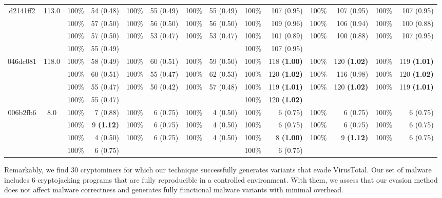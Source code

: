 \begin{adjustbox}{width=1\linewidth}
{\begin{tabular}{c c | cr  cr  cr || cr  cr  cr}
        \hline
   d2141ff2  &  113.0    &  100\%  & 54 (0.48)   &  100\%  & 55 (0.49)   &  100\%  & 55 (0.49)    &  100\%  & 107 (0.95)   &  100\%  & 107 (0.95)   &  100\%  & 107 (0.95)  \\ &    &  100\%  & 57 (0.50)   &  100\%  & 56 (0.50)   &  100\%  & 56 (0.50)    &  100\%  & 109 (0.96)   &  100\%  & 106 (0.94)   &  100\%  & 100 (0.88)  \\ &    &  100\%  & 57 (0.50)   &  100\%  & 53 (0.47)   &  100\%  & 53 (0.47)    &  100\%  & 101 (0.89)   &  100\%  & 100 (0.88)   &  100\%  & 107 (0.95)  \\ &    &  100\%  & 55 (0.49)     &   &  &  &   &  100\%  & 107 (0.95)  \\
        \hline
   046dc081  &  118.0    &  100\%  & 58 (0.49)   &  100\%  & 60 (0.51)   &  100\%  & 59 (0.50)    &  100\%  & 118 \textbf{(1.00)}    &  100\%  & 120 \textbf{(1.02)}    &  100\%  & 119 \textbf{(1.01)}   \\ &    &  100\%  & 60 (0.51)   &  100\%  & 55 (0.47)   &  100\%  & 62 (0.53)    &  100\%  & 120 \textbf{(1.02)}    &  100\%  & 116 (0.98)   &  100\%  & 120 \textbf{(1.02)}   \\ &    &  100\%  & 55 (0.47)   &  100\%  & 50 (0.42)   &  100\%  & 57 (0.48)    &  100\%  & 119 \textbf{(1.01)}    &  100\%  & 120 \textbf{(1.02)}    &  100\%  & 119 \textbf{(1.01)}   \\ &    &  100\%  & 55 (0.47)     &   &  &  &   &  100\%  & 120 \textbf{(1.02)}   \\
        \hline
   006b2fb6  &  8.0    &  100\%  & 7 (0.88)   &  100\%  & 6 (0.75)   &  100\%  & 4 (0.50)    &  100\%  & 6 (0.75)   &  100\%  & 6 (0.75)   &  100\%  & 6 (0.75)  \\ &    &  100\%  & 9 \textbf{(1.12)}    &  100\%  & 6 (0.75)   &  100\%  & 4 (0.50)    &  100\%  & 6 (0.75)   &  100\%  & 6 (0.75)   &  100\%  & 6 (0.75)  \\ &    &  100\%  & 4 (0.50)   &  100\%  & 6 (0.75)   &  100\%  & 4 (0.50)    &  100\%  & 8 \textbf{(1.00)}    &  100\%  & 9 \textbf{(1.12)}    &  100\%  & 6 (0.75)  \\ &    &  100\%  & 6 (0.75)     &   &  &  &  &  100\%  & 6 (0.75)  \\
        \hline
    
        
    \end{tabular}
}
\end{adjustbox}




Remarkably, we find 30 cryptominers for which our technique successfully generates variants that evade VirusTotal.
Our set of malware includes 6 cryptojacking programs that are fully reproducible in a controlled environment. 
With them, we assess that our evasion method does not affect malware correctness and generates fully functional malware variants with minimal overhead.

